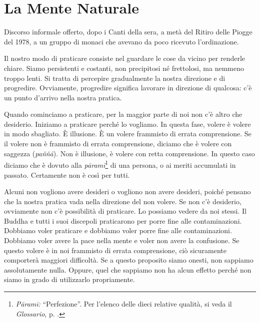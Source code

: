 \chapter{La Mente Naturale}

\begin{openingQuote}
  \centering

  Discorso informale offerto, dopo i Canti della sera, a metà del Ritiro delle
  Piogge del 1978, a un gruppo di monaci che avevano da poco ricevuto
  l'ordinazione.
\end{openingQuote}

Il nostro modo di praticare consiste nel guardare le cose da vicino per
renderle chiare. Siamo persistenti e costanti, non precipitosi né
frettolosi, ma nemmeno troppo lenti. Si tratta di percepire gradualmente
la nostra direzione e di progredire. Ovviamente, progredire significa
lavorare in direzione di qualcosa: c'è un punto d'arrivo nella nostra
pratica.

Quando cominciamo a praticare, per la maggior parte di noi non c'è altro
che desiderio. Iniziamo a praticare perché lo vogliamo. In questa fase,
volere è volere in modo sbagliato. È illusione. È un volere frammisto di
errata comprensione. Se il volere non è frammisto di errata
comprensione, diciamo che è volere con saggezza (\emph{paññā}). Non è
illusione, è volere con retta comprensione. In questo caso diciamo che è
dovuto alla \emph{pāramī}\footnote{\emph{Pāramī:} ``Perfezione''. Per
  l'elenco delle dieci relative qualità, si veda il \emph{Glossario}, p. \pageref{glossary-parami}.}
di una persona, o ai meriti accumulati in passato. Certamente non è così
per tutti.

Alcuni non vogliono avere desideri o vogliono non avere desideri, poiché
pensano che la nostra pratica vada nella direzione del non volere. Se
non c'è desiderio, ovviamente non c'è possibilità di praticare. Lo
possiamo vedere da noi stessi. Il Buddha e tutti i suoi discepoli
praticarono per porre fine alle contaminazioni. Dobbiamo voler praticare
e dobbiamo voler porre fine alle contaminazioni. Dobbiamo voler avere la
pace nella mente e voler non avere la confusione. Se questo volere è in
noi frammisto di errata comprensione, ciò sicuramente comporterà
maggiori difficoltà. Se a questo proposito siamo onesti, non sappiamo
assolutamente nulla. Oppure, quel che sappiamo non ha alcun effetto
perché non siamo in grado di utilizzarlo propriamente.

